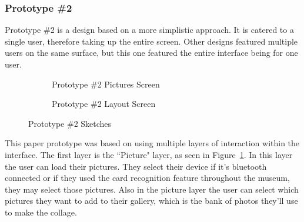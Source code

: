 \documentclass{tei2013}
\begin{document}
\subsubsection{Prototype \#2}
Prototype \#2 is a design based on a more simplistic approach. It is catered to a single user, therefore taking up the entire screen. Other designs featured multiple users on the same surface, but this one featured the entire interface being for one user. 
\begin{figure}[htb]
\centering
\begin{subfigure}[b]{.48\textwidth}
\centering
{}
\caption{Prototype \#2 Pictures Screen}
\label{fig:prot2-1}
\end{subfigure}
\begin{subfigure}[b]{.48\textwidth}
\centering
{}
\caption{Prototype \#2 Layout Screen}
\label{fig:prot2-2}
\end{subfigure}

\caption{Prototype \#2 Sketches}
\end{figure}

This paper prototype was based on using multiple layers of interaction within the interface. The first layer is the ``Picture" layer, as seen in Figure~\ref{fig:prot2-1}. In this layer the user can load their pictures. They select their device if it's bluetooth connected or if they used the card recognition feature throughout the museum, they may select those pictures. Also in the picture layer the user can select which pictures they want to add to their gallery, which is the bank of photos they'll use to make the collage. 
\end{document}
